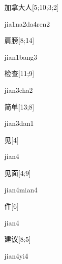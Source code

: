 \begin{verbete}{加拿大人}[5;10;3;2]
\begin{pronuncia}[\\]{jia1na2da4ren2}
\end{pronuncia}
\end{verbete}

\begin{verbete}{肩膀}[8;14]
\begin{pronuncia}{jian1bang3}
\end{pronuncia}
\end{verbete}

\begin{verbete}{检查}[11;9]
\begin{pronuncia}{jian3cha2}
\end{pronuncia}
\end{verbete}

\begin{verbete}{简单}[13;8]
\begin{pronuncia}{jian3dan1}
\end{pronuncia}
\end{verbete}

\begin{verbete}[jian4]{见}[4]
\begin{pronuncia}{jian4}
\end{pronuncia}
\end{verbete}

\begin{verbete}{见面}[4;9]
\begin{pronuncia}{jian4mian4}
\end{pronuncia}
\end{verbete}

\begin{verbete}[jian4]{件}[6]
\begin{pronuncia}{jian4}
\end{pronuncia}
\end{verbete}

\begin{verbete}[jian4yi4]{建议}[8;5]
\begin{pronuncia}{jian4yi4}
\end{pronuncia}
\end{verbete}

